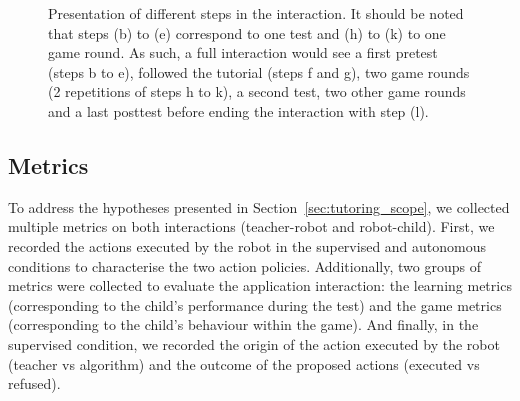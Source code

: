 \begin{figure}[ht]
	\caption{Presentation of different steps in the interaction. It should be noted that steps (b) to (e) correspond to one test and (h) to (k) to one game round. As such, a full interaction would see a first pretest (steps b to e), followed the tutorial (steps f and g), two game rounds (2 repetitions of steps h to k), a second test, two other game rounds and a last posttest before ending the interaction with step (l).}
	\label{fig:tuto_sequence}
\end{figure}


\subsection{Metrics} \label{sec:tuto_metric}


To address the hypotheses presented in Section~\ref{sec:tutoring_scope}, we collected multiple metrics on both interactions (teacher-robot and robot-child). First, we recorded the actions executed by the robot in the supervised and autonomous conditions to characterise the two action policies. Additionally, two groups of metrics were collected to evaluate the application interaction: the learning metrics (corresponding to the child's performance during the test) and the game metrics (corresponding to the child's behaviour within the game). And finally, in the supervised condition, we recorded the origin of the action executed by the robot (teacher vs algorithm) and the outcome of the proposed actions (executed vs refused).

